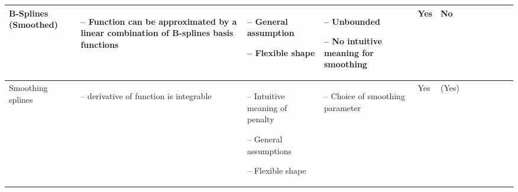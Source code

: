 \begin{table}[!ht]
\begin{tabular}{p{1.6cm}p{3.3cm}p{3.3cm}p{3.4cm}p{0.4cm}p{0.4cm}p{3cm}p{3cm}p{3cm}p{3cm}p{2.7cm}p{3cm}|}
		B-Splines (Smoothed)                                                                                                                                         &
		\begin{cptitemize} \item[--]  Function can be approximated by a linear combination of B-splines basis functions               \end{cptitemize}               &
		\begin{cptitemize} \item[--]  General assumption \item[--]  Flexible shape                                                            \end{cptitemize}        &
		\begin{cptitemize} \item[--]  Unbounded \item[--]  No intuitive meaning for smoothing                                                \end{cptitemize}        &
		Yes                                                                                                                                                            &
		No                                            \\ \hline%

		Smoothing splines                                                                                                                                            &
		\begin{cptitemize} \item[--]  \nth{2} derivative of function is integrable                                                        \end{cptitemize}               &
		\begin{cptitemize} \item[--]  Intuitive meaning of penalty \item[--]  General assumptions \item[--]  Flexible shape                         \end{cptitemize} &
		\begin{cptitemize} \item[--]  Choice of smoothing parameter                                                                                       \end{cptitemize}               &
		Yes                                                                                                                                                          &
        (Yes) \\                                                                         


\end{tabular}
\end{table}
